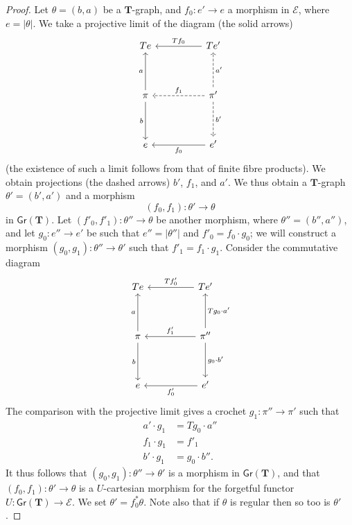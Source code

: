 \documentclass[fleqn]{article}
\newcommand{\oldpage}[1]{\marginpar{\footnotesize$\Big\vert$ \textit{p.~#1}}}
\newcommand{\TT}{\mathbf{T}}
\newcommand{\cat}[1]{\mathcal{#1}}
\newcommand{\Cat}[1]{\mathsf{#1}}
\newcommand{\set}[1]{|#1|}
\newcommand{\Gr}[1]{\Cat{Gr}(#1)}
\begin{document}
\begin{proof}
  Let $\theta=(b,a)$ be a $\TT$-graph, and $f_0\colon e'\to e$ a morphism in $\cat{E}$, where $e=\set{\theta}$.
  We take a projective limit of the diagram (the solid arrows)
  \[
    \begin{tikzcd}[sep=huge]
      Te
    & Te'
        \ar[l,swap,"Tf_0"]
    \\\pi
        \ar[u,"a"]
        \ar[d,swap,"b"]
    & \pi'
        \ar[u,dashed,swap,"a'"]
        \ar[l,dashed,swap,"f_1"]
        \ar[d,dashed,"b'"]
    \\e
    & e'
        \ar[l,"f_0"]
    \end{tikzcd}
  \]
  (the existence of such a limit follows from that of finite fibre products).
  We obtain projections (the dashed arrows) $b'$, $f_1$, and $a'$.
  We thus obtain a $\TT$-graph $\theta'=(b',a')$ and a morphism
  \[
    (f_0,f_1)\colon\theta'\to\theta
  \]
  in $\Gr{\TT}$.
  Let $(f'_0,f'_1)\colon\theta''\to\theta$ be another morphism, where $\theta''=(b'',a'')$, and let $g_0\colon e''\to e'$ be such that $e''=\set{\theta''}$ and $f'_0=f_0\cdot g_0$;
  we will construct a morphism $(g_0,g_1)\colon\theta''\to\theta'$ such that $f'_1=f_1\cdot g_1$.
  Consider the commutative diagram
  \[
    \begin{tikzcd}[sep=huge]
      Te
    & Te'
        \ar[l,swap,"Tf'_0"]
    \\\pi
        \ar[u,"a"]
        \ar[d,swap,"b"]
    & \pi''
        \ar[u,swap,"Tg_0\cdot a'"]
        \ar[l,swap,"f'_1"]
        \ar[d,"g_0\cdot b'"]
    \\e
    & e'
        \ar[l,"f'_0"]
    \end{tikzcd}
  \]
  \oldpage{236}
  The comparison with the projective limit gives a crochet $g_1\colon\pi''\to\pi'$ such that
  \[
    \begin{aligned}
      a'\cdot g_1
    & = Tg_0\cdot a''
    \\f_1\cdot g_1
    & = f'_1
    \\b'\cdot g_1
    & = g_0\cdot b''.
    \end{aligned}
  \]
  It thus follows that $(g_0,g_1)\colon\theta''\to\theta'$ is a morphism in $\Gr{\TT}$, and that $(f_0,f_1)\colon\theta'\to\theta$ is a $U$-cartesian morphism for the forgetful functor $U\colon\Gr{\TT}\to\cat{E}$.
  We set $\theta'=f_0^*\theta$.
  Note also that if $\theta$ is regular then so too is $\theta'$.


\end{proof}
\end{document}
